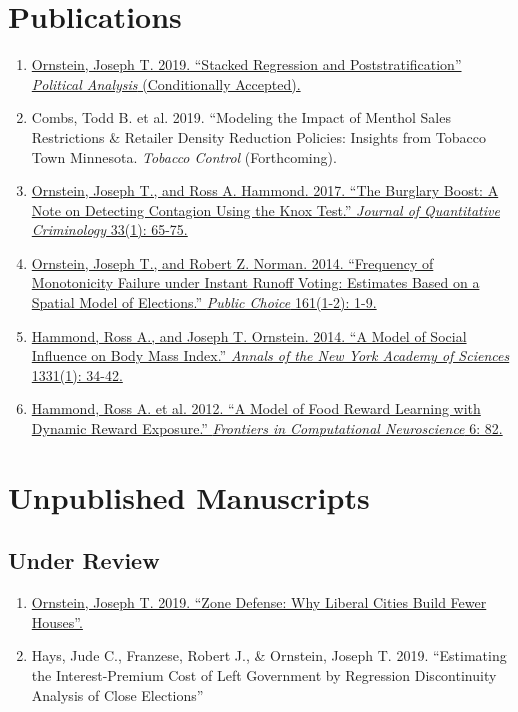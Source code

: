 \documentclass[letterpaper]{article}
\begin{document}
\hrulefill

\section*{Publications}
\begin{enumerate}
\item \href{https://joeornstein.github.io/SRP.html}{Ornstein, Joseph T. 2019. ``Stacked Regression and Poststratification'' \textit{Political Analysis} (Conditionally Accepted).} 
\item Combs, Todd B. et al. 2019. ``Modeling the Impact of Menthol Sales Restrictions \& Retailer Density Reduction Policies: Insights from Tobacco Town Minnesota. \textit{Tobacco Control} (Forthcoming).
\item \href{https://joeornstein.github.io/papers/Ornstein-Hammond2017.pdf}{Ornstein, Joseph T., and Ross A. Hammond. 2017. ``The Burglary Boost: A Note on Detecting Contagion Using the Knox Test.'' \textit{Journal of Quantitative Criminology} 33(1): 65-75.}
\item \href{https://joeornstein.github.io/MonotonicityFailure.html}{Ornstein, Joseph T., and Robert Z. Norman. 2014. ``Frequency of Monotonicity Failure under Instant Runoff Voting: Estimates Based on a Spatial Model of Elections.'' \textit{Public Choice} 161(1-2): 1-9.}
\item \href{https://joeornstein.github.io/papers/Hammond_et_al-2014-Annals_of_the_New_York_Academy_of_Sciences.pdf}{Hammond, Ross A., and Joseph T. Ornstein. 2014. ``A Model of Social Influence on Body Mass Index.'' \textit{Annals of the New York Academy of Sciences} 1331(1): 34-42.}
\item \href{https://joeornstein.github.io/papers/Hammond-2012.pdf}{Hammond, Ross A. et al. 2012. ``A Model of Food Reward Learning with Dynamic Reward Exposure.'' \textit{Frontiers in Computational Neuroscience} 6: 82.}
\end{enumerate}

\hrulefill
\section*{Unpublished Manuscripts}
\subsection*{Under Review}
\begin{enumerate}
\item \href{https://joeornstein.github.io/papers/ornstein-zone-defense.pdf}{Ornstein, Joseph T. 2019. ``Zone Defense: Why Liberal Cities Build Fewer Houses''.}
\item Hays, Jude C., Franzese, Robert J., \& Ornstein, Joseph T. 2019. ``Estimating the Interest-Premium Cost of Left Government by Regression Discontinuity Analysis of Close Elections''
\end{enumerate}
\end{document}
